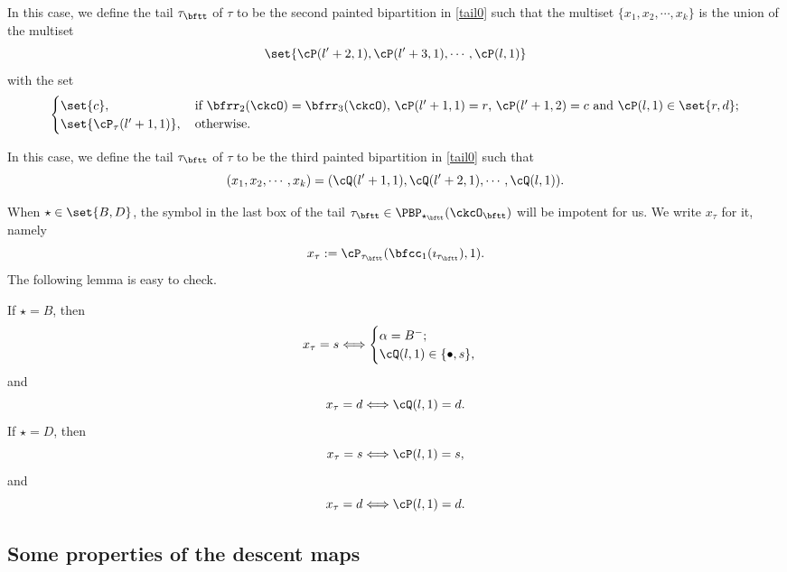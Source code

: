 \documentclass[ssunip]{subfiles}
\begin{document}
\smallskip

 \smallskip




 
 
In this case, we define the tail $\tau_\bftt$ of $\tau$ to be the second painted bipartition in \eqref{tail0} such that the multiset $\{x_1, x_2, \cdots, x_k\}$ is the 
union of the multiset 
\[
\set{\cP(l'+2,1),\cP(l'+3,1),\cdots, \cP(l,1)}
\]
with the set
\[
  \begin{cases}
 \set{c}, &
 \, 
  \text{if $\bfrr_2(\ckcO)=\bfrr_3(\ckcO)$, 
  $\cP(l'+1,1) = r$, $\cP(l'+1,2) = c$ and $\cP(l,1)\in \set{r,d}$};  \\ 
\set{\cP_\tau(l'+1,1)},&
\,   \text{otherwise.}
\end{cases}
\]
 
 \smallskip
 
 \smallskip
 
In this case, we define the tail $\tau_\bftt$ of $\tau$ to be the third painted bipartition in \eqref{tail0} such that 
\[
  (x_1, x_2, \cdots, x_k)= (\cQ(l'+1,1),\cQ(l'+2,1),\cdots, \cQ(l,1)).
\]
 
 
 When $\star \in \set{B,D}$, the symbol in the last box of the tail $\tau_\bftt\in \PBP_{\star_\bftt}(\ckcO_\bftt)$ will be impotent for us. We write $x_\tau$ for it, namely
\[
x_\tau := \cP_{\tau_\bftt}(\bfcc_1(\imath_{\tau_\bftt}),1).
\]
 The following lemma is easy to check.
 
\begin{lem}\label{tailtip}
If $\star=B$, then
\[
x_\tau=s\Longleftrightarrow
\begin{cases}
  \alpha=B^-;\\ 
  \cQ(l,1) \in\{\bullet, s\}, 
  \end{cases}
\]
and 
\[
x_\tau=d \Longleftrightarrow
\cQ(l,1) =d. 
\]
If $\star=D$, then
\[
x_\tau=s\Longleftrightarrow \cP(l,1) = s, 
\]
and 
\[
x_\tau=d\Longleftrightarrow \cP(l,1) =d. 
\]

\end{lem}







\subsection{Some properties of the descent maps}
\end{document}
